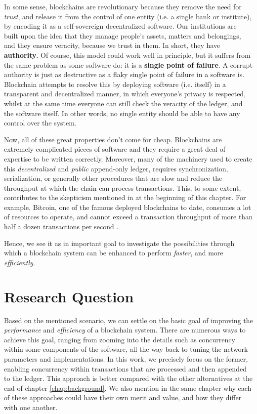 In some sense, blockchains are revolutionary because they remove the need for \textit{trust}, and
release it from the control of one entity (i.e. a single bank or institute), by encoding it as a
self-sovereign decentralized software. Our institutions are built upon the idea that they manage
people's assets, matters and belongings, and they ensure veracity, because we trust in them. In
short, they have \textbf{authority}. Of course, this model could work well in principle, but it
suffers from the same problem as some software do: it is a \textbf{single point of failure}. A
corrupt authority is just as destructive as a flaky single point of failure in a software is.
Blockchain attempts to resolve this by deploying software (i.e. itself) in a transparent and
decentralized manner, in which everyone's privacy is respected, whilst at the same time everyone can
still check the veracity of the ledger, and the software itself. In other words, no single entity
should be able to have any control over the system.

Now, all of these great properties don't come for cheap. Blockchains are extremely complicated
pieces of software and they require a great deal of expertise to be written correctly. Moreover,
many of the machinery used to create this \textit{decentralized} and \textit{public} append-only
ledger, requires synchronization, serialization, or generally other procedures that are slow and
reduce the throughput at which the chain can process transactions. This, to some extent, contributes
to the skepticism mentioned in at the beginning of this chapter. For example, Bitcoin, one of the
famous deployed blockchains to date, consumes a lot of resources to operate, and cannot exceed a
transaction throughput of more than half a dozen transactions per second \cite{security_of_bitcoin}.

Hence, we see it as in important goal to investigate the possibilities through which a blockchain
system can be enhanced to perform \textit{faster}, and more \textit{efficiently}.

\section{Research Question} \label{chap_intro:sec:resarch_q}

Based on the mentioned scenario, we can settle on the basic goal of improving the
\textit{performance} and \textit{efficiency} of a blockchain system. There are numerous ways to
achieve this goal, ranging from zooming into the details such as concurrency within some components
of the software, all the way back to tuning the network parameters and implementations. In this
work, we precisely focus on the former, enabling concurrency within transactions that are processed
and then appended to the ledger. This approach is better compared with the other alternatives at the
end of chapter \ref{chap:background}. We also mention in the same chapter why each of these
approaches could have their own merit and value, and how they differ with one another.

